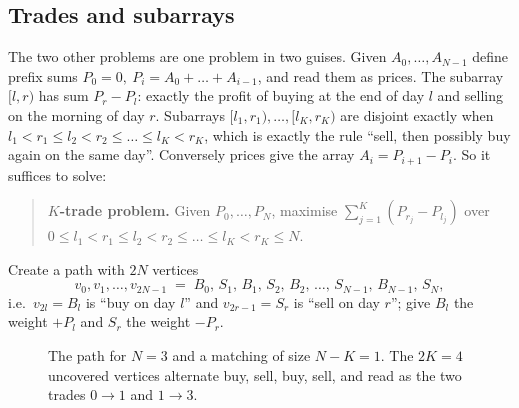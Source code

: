 \documentclass[11pt]{article}
\begin{document}
\subsection{Trades and subarrays}
The two other problems are one problem in two guises. Given
$A_0,\dots,A_{N-1}$ define prefix sums $P_0=0,\ P_i=A_0+\dots+A_{i-1}$,
and read them as prices. The subarray $[l,r)$ has sum $P_r-P_l$:
exactly the profit of buying at the end of day $l$ and selling on the
morning of day $r$. Subarrays $[l_1,r_1),\dots,[l_K,r_K)$ are disjoint
exactly when $l_1<r_1\le l_2<r_2\le\dots\le l_K<r_K$, which is exactly
the rule ``sell, then possibly buy again on the same day''. Conversely
prices give the array $A_i=P_{i+1}-P_i$. So it suffices to solve:

\begin{quote}
\textbf{$K$-trade problem.} Given $P_0,\dots,P_N$, maximise
$\sum_{j=1}^K(P_{r_j}-P_{l_j})$ over $0\le l_1<r_1\le l_2<r_2\le\dots\le l_K<r_K\le N$.
\end{quote}

Create a path with $2N$ vertices
\[
  v_0,v_1,\dots,v_{2N-1}\;=\;B_0,\,S_1,\,B_1,\,S_2,\,B_2,\,\dots,\,S_{N-1},\,B_{N-1},\,S_N,
\]
i.e.\ $v_{2l}=B_l$ is ``buy on day $l$'' and $v_{2r-1}=S_r$ is ``sell on
day $r$''; give $B_l$ the weight $+P_l$ and $S_r$ the weight $-P_r$.

\begin{figure}[H]
\centering
{}
\caption{The path for $N=3$ and a matching of size $N-K=1$. The $2K=4$
uncovered vertices alternate buy, sell, buy, sell, and read as the two trades
$0\to1$ and $1\to3$.}\label{fig:trade}
\end{figure}
\end{document}
